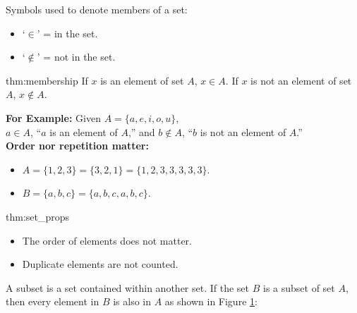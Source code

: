 \noindent
Symbols used to denote members of a set:
\begin{itemize}
    \item `$\in$' = in the set.
    \item `$\notin$' = not in the set.
\end{itemize}

\begin{theo}[Membership]{thm:membership}
    If $x$ is an element of set $A$, $x \in A$.
    If $x$ is not an element of set $A$, $x \notin A$.
\end{theo}

\noindent
\textbf{For Example:} Given $A = \{a, e, i, o, u\}$,\\
$a \in A$, ``$a$ is an element of $A$,'' and
$b \notin A$, ``$b$ is not an element of $A$.''\\

\noindent
\textbf{Order nor repetition matter:}
\begin{itemize}
    \item $A = \{1, 2, 3\} = \{3, 2, 1\} = \{1, 2, 3, 3, 3, 3, 3\}$.
    \item $B = \{a, b, c\} = \{a, b, c, a, b, c\}$.
\end{itemize}

\begin{theo}{thm:set_props}
    \begin{itemize}
        \item The order of elements does not matter.
        \item Duplicate elements are not counted.
    \end{itemize}
\end{theo}

\noindent
A subset is a set contained within another set. If the set $B$ is a subset of set $A$,
then every element in $B$ is also in $A$ as shown in Figure \ref{fig:subset}:


\begin{figure}[ht]
    \centering
    \caption{}
    \label{fig:subset}
\end{figure}


